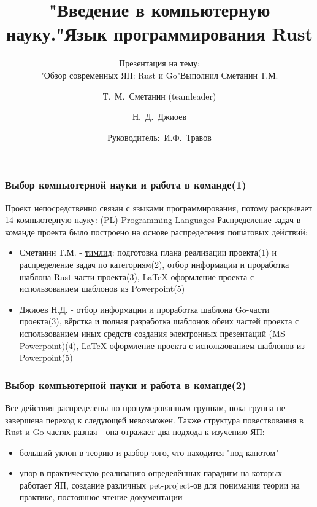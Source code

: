 \documentclass[11pt]{beamer}
\title{"Введение в компьютерную науку."}
\institute{НИЯУ МИФИ}
\subtitle{Презентация на тему:\\ "Обзор современных ЯП: Rust и Go"}
\author[Джиоев, Сметанин] %
{Т.~М.~Сметанин (teamleader) \and Н.~Д.~Джиоев\and Руководитель:~И.Ф.~Травов}
\date[2023 год] %
\begin{document}
\maketitle
\begin{frame}
\frametitle{Выбор компьютерной науки и работа в команде(1)}
Проект непосредственно связан с языками программирования, потому раскрывает 14 компьютерную науку: {\color{blue} (PL) Programming Languages}
Распределение задач в команде проекта было построено на основе распределения пошаговых действий:
\begin{itemize}
    \item {\color{blue}Сметанин Т.М.} - \underline{тимлид}: подготовка плана реализации проекта(1) и распределение задач по категориям(2), отбор информации и проработка шаблона Rust-части проекта(3), LaTeX оформление проекта с использованием шаблонов из Powerpoint(5)
    \item {\color{blue}Джиоев Н.Д.} - отбор информации и проработка шаблона Go-части проекта(3), вёрстка и полная разработка шаблонов обеих частей проекта с использованием иных средств создания электронных презентаций (MS Powerpoint)(4), LaTeX оформление проекта с использованием шаблонов из Powerpoint(5)
\end{itemize}
\end{frame}
\begin{frame}
\frametitle{Выбор компьютерной науки и работа в команде(2)}
Все действия распределены по пронумерованным группам, пока группа не завершена переход к следующей невозможен. Также структура повествования в Rust и Go частях разная - она отражает два подхода к изучению ЯП:
\begin{itemize}
    \item больший уклон в теорию и разбор того, что находится "под капотом"
    \item упор в практическую реализацию определённых парадигм на которых работает ЯП, создание различных pet-project-ов для понимания теории на практике, постоянное чтение документации
\end{itemize}
\end{frame}
\title{Язык программирования Rust}
\subtitle{Выполнил Сметанин Т.М.}
\maketitle
\end{document}
